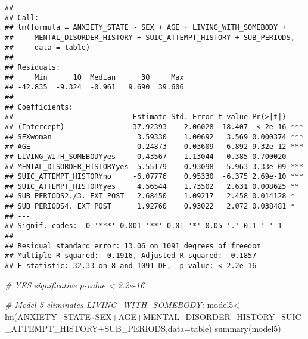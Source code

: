 \documentclass[
]{book}
\newenvironment{Shaded}{\begin{snugshade}}{\end{snugshade}}
\newcommand{\AttributeTok}[1]{\textcolor[rgb]{0.77,0.63,0.00}{#1}}
\newcommand{\CommentTok}[1]{\textcolor[rgb]{0.56,0.35,0.01}{\textit{#1}}}
\newcommand{\FunctionTok}[1]{\textcolor[rgb]{0.00,0.00,0.00}{#1}}
\newcommand{\NormalTok}[1]{#1}
\newcommand{\OtherTok}[1]{\textcolor[rgb]{0.56,0.35,0.01}{#1}}
\newcommand{\SpecialCharTok}[1]{\textcolor[rgb]{0.00,0.00,0.00}{#1}}
\begin{document}
\begin{verbatim}
## 
## Call:
## lm(formula = ANXIETY_STATE ~ SEX + AGE + LIVING_WITH_SOMEBODY + 
##     MENTAL_DISORDER_HISTORY + SUIC_ATTEMPT_HISTORY + SUB_PERIODS, 
##     data = table)
## 
## Residuals:
##     Min      1Q  Median      3Q     Max 
## -42.835  -9.324  -0.961   9.690  39.606 
## 
## Coefficients:
##                            Estimate Std. Error t value Pr(>|t|)    
## (Intercept)                37.92393    2.06028  18.407  < 2e-16 ***
## SEXwoman                    3.59330    1.00692   3.569 0.000374 ***
## AGE                        -0.24873    0.03609  -6.892 9.32e-12 ***
## LIVING_WITH_SOMEBODYyes    -0.43567    1.13044  -0.385 0.700020    
## MENTAL_DISORDER_HISTORYyes  5.55179    0.93098   5.963 3.33e-09 ***
## SUIC_ATTEMPT_HISTORYno     -6.07776    0.95330  -6.375 2.69e-10 ***
## SUIC_ATTEMPT_HISTORYyes     4.56544    1.73502   2.631 0.008625 ** 
## SUB_PERIODS2./3. EXT POST   2.68450    1.09217   2.458 0.014128 *  
## SUB_PERIODS4. EXT POST      1.92760    0.93022   2.072 0.038481 *  
## ---
## Signif. codes:  0 '***' 0.001 '**' 0.01 '*' 0.05 '.' 0.1 ' ' 1
## 
## Residual standard error: 13.06 on 1091 degrees of freedom
## Multiple R-squared:  0.1916, Adjusted R-squared:  0.1857 
## F-statistic: 32.33 on 8 and 1091 DF,  p-value: < 2.2e-16
\end{verbatim}

\begin{Shaded}
\begin{Highlighting}[]
\CommentTok{\# YES significative p{-}value \textless{} 2.2e{-}16}

\CommentTok{\# Model 5 eliminates LIVING\_WITH\_SOMEBODY:}
\NormalTok{model5}\OtherTok{\textless{}{-}}\FunctionTok{lm}\NormalTok{(ANXIETY\_STATE}\SpecialCharTok{\textasciitilde{}}\NormalTok{SEX}\SpecialCharTok{+}\NormalTok{AGE}\SpecialCharTok{+}\NormalTok{MENTAL\_DISORDER\_HISTORY}\SpecialCharTok{+}\NormalTok{SUIC\_ATTEMPT\_HISTORY}\SpecialCharTok{+}\NormalTok{SUB\_PERIODS,}\AttributeTok{data=}\NormalTok{table)}
\FunctionTok{summary}\NormalTok{(model5)}
\end{Highlighting}
\end{Shaded}
\end{document}
